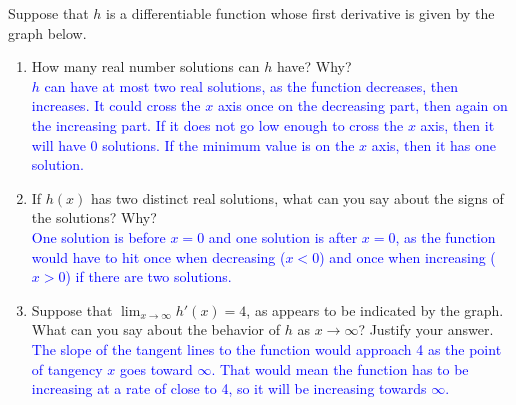 \documentclass{ximera}
\begin{document}
\begin{exercise}
    Suppose that $h$ is a differentiable function whose first derivative is given by the graph below.
    \begin{image}
    \end{image}
    \begin{enumerate}
        \item How many real number solutions can $h$ have? Why? \\
        \textcolor{blue}{$h$ can have at most two real solutions, as the function decreases, then increases.  It could cross the $x$ axis once on the decreasing part, then again on the increasing part.  If it does not go low enough to cross the $x$ axis, then it will have 0 solutions.  If the minimum value is on the $x$ axis, then it has one solution.}
        \item If $h(x)$ has two distinct real solutions, what can you say about the signs of the solutions?  Why?\\
        \textcolor{blue}{One solution is before $x=0$ and one solution is after $x=0$, as the function would have to hit once when decreasing ($x<0$) and once when increasing ($x>0$) if there are two solutions.}
        \item Suppose that $\lim_{x\rightarrow \infty}h'(x)=4$, as appears to be indicated by the graph. What can you say about the behavior of $h$ as $x\rightarrow \infty$?  Justify your answer.\\
        \textcolor{blue}{The slope of the tangent lines to the function would approach 4 as the point of tangency $x$ goes toward $\infty$. That would mean the function has to be increasing at a rate of close to 4, so it will be increasing towards $\infty$.}
    \end{enumerate}
\end{exercise}
\end{document}
